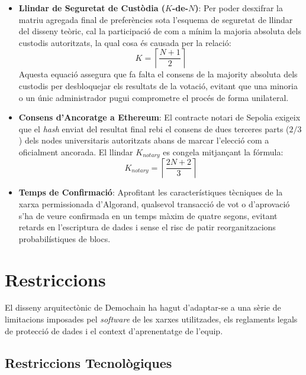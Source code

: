 \begin{itemize}
    \item \textbf{Llindar de Seguretat de Custòdia ($K$-de-$N$)}: Per poder desxifrar la matriu agregada final de
    preferències sota l'esquema de seguretat de llindar del disseny teòric, cal la participació de com a mínim la
    majoria absoluta dels custodis autoritzats, la qual cosa és causada per la relació:
    \[ K = \left\lceil \frac{N + 1}{2} \right\rceil \]
    Aquesta equació assegura que fa falta el consens de la majority absoluta dels custodis per desbloquejar els
    resultats de la votació, evitant que una minoria o un únic administrador pugui comprometre el procés de forma
    unilateral.

    \item \textbf{Consens d'Ancoratge a Ethereum}: El contracte notari de Sepolia exigeix que el \textit{hash} enviat
    del resultat final rebi el consens de dues terceres parts ($2/3$) dels nodes universitaris autoritzats abans de
    marcar l'elecció com a oficialment ancorada.
    El llindar $K_{notary}$ es congela mitjançant la fórmula:
    \[ K_{notary} = \left\lceil \frac{2N + 2}{3} \right\rceil \]

    \item \textbf{Temps de Confirmació}: Aprofitant les característiques tècniques de la xarxa permissionada d'Algorand,
    qualsevol transacció de vot o d'aprovació s'ha de veure confirmada en un temps màxim de quatre segons, evitant
    retards en l'escriptura de dades i sense el risc de patir reorganitzacions probabilístiques de blocs.
\end{itemize}


\section{Restriccions}
\label{sec:restriccions}

El disseny arquitectònic de Demochain ha hagut d'adaptar-se a una sèrie de limitacions imposades pel \textit{software} de les
xarxes utilitzades, els reglaments legals de protecció de dades i el context d'aprenentatge de l'equip.

\subsection{Restriccions Tecnològiques}
\label{subsec:restriccions-tecnologiques}

